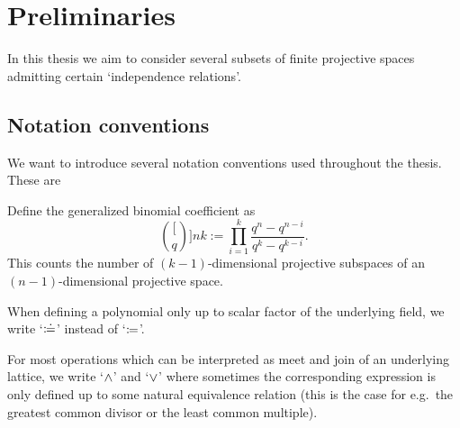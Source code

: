 \section{Preliminaries}

In this thesis we aim to consider several subsets of finite projective spaces admitting certain `independence relations'.

\subsection{Notation conventions}

We want to introduce several notation conventions used throughout the thesis.
These are 
\begin{definition}
    Define the generalized binomial coefficient as
    $$
    \binom[q]{n}{k}:= \prod_{i=1}^{k}{\frac{q^n-q^{n-i}}{q^k-q^{k-i}}}.
    $$
    This counts the number of $(k-1)$-dimensional projective subspaces of an $(n-1)$-dimensional projective space.
\end{definition}

When defining a polynomial only up to scalar factor of the underlying field, we write `$\mathrel{\mathrel{\mathop:}\mkern-1.2mu\doteq}$' instead of `$\mathrel{\mathrel{\mathop:}\mkern-1.2mu=}$'.

For most operations which can be interpreted as meet and join of an underlying lattice, we write `$\wedge$' and `$\vee$' where sometimes the corresponding expression is only defined up to some natural equivalence relation (this is the case for e.g.~the greatest common divisor or the least common multiple).


